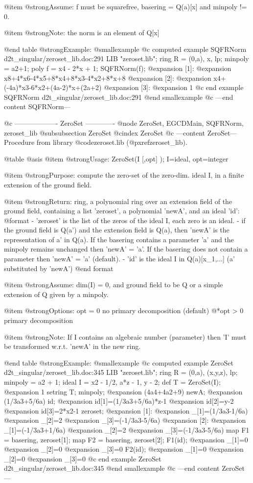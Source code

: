 @item @strong{Assume:}
f must be squarefree, basering = Q(a)[x] and minpoly != 0.

@item @strong{Note:}
the norm is an element of Q[x]

@end table
@strong{Example:}
@smallexample
@c computed example SQFRNorm d2t_singular/zeroset_lib.doc:291 
LIB "zeroset.lib";
ring R = (0,a), x, lp;
minpoly = a2+1;
poly f =  x4 - 2*x + 1;
SQFRNorm(f);
@expansion{} [1]:
@expansion{}    x8+4*x6-4*x5+8*x4+8*x3-4*x2+8*x+8
@expansion{} [2]:
@expansion{}    x4+(-4a)*x3-6*x2+(4a-2)*x+(2a+2)
@expansion{} [3]:
@expansion{}    1
@c end example SQFRNorm d2t_singular/zeroset_lib.doc:291
@end smallexample
@c ---end content SQFRNorm---

@c ------------------- ZeroSet -------------
@node ZeroSet, EGCDMain, SQFRNorm, zeroset_lib
@subsubsection ZeroSet
@cindex ZeroSet
@c ---content ZeroSet---
Procedure from library @code{zeroset.lib} (@pxref{zeroset_lib}).

@table @asis
@item @strong{Usage:}
ZeroSet(I [,opt] ); I=ideal, opt=integer

@item @strong{Purpose:}
compute the zero-set of the zero-dim. ideal I, in a finite extension
of the ground field.

@item @strong{Return:}
ring, a polynomial ring over an extension field of the ground field,
containing a list 'zeroset', a polynomial 'newA', and an
ideal 'id':
  @format
  - 'zeroset' is the list of the zeros of the ideal I, each zero is an ideal.
  - if the ground field is Q(a') and the extension field is Q(a), then
    'newA' is the representation of a' in Q(a).
    If the basering contains a parameter 'a' and the minpoly remains unchanged
    then 'newA' = 'a'.
    If the basering does not contain a parameter then 'newA' = 'a' (default).    
  - 'id' is the ideal I in Q(a)[x_1,...] (a' substituted by 'newA')
  @end format

@item @strong{Assume:}
dim(I) = 0, and ground field to be Q or a simple extension of Q given
by a minpoly.

@item @strong{Options:}
opt = 0 no primary decomposition (default)
@*opt > 0 primary decomposition

@item @strong{Note:}
If I contains an algebraic number (parameter) then 'I' must be
transformed w.r.t. 'newA' in the new ring.

@end table
@strong{Example:}
@smallexample
@c computed example ZeroSet d2t_singular/zeroset_lib.doc:345 
LIB "zeroset.lib";
ring R = (0,a), (x,y,z), lp;
minpoly = a2 + 1;
ideal I = x2 - 1/2, a*z - 1, y - 2;
def T = ZeroSet(I);
@expansion{} 1
setring T;
minpoly;
@expansion{} (4a4+4a2+9)
newA;
@expansion{} (1/3a3+5/6a)
id;
@expansion{} id[1]=(1/3a3+5/6a)*z-1
@expansion{} id[2]=y-2
@expansion{} id[3]=2*x2-1
zeroset;
@expansion{} [1]:
@expansion{}    _[1]=(1/3a3-1/6a)
@expansion{}    _[2]=2
@expansion{}    _[3]=(-1/3a3-5/6a)
@expansion{} [2]:
@expansion{}    _[1]=(-1/3a3+1/6a)
@expansion{}    _[2]=2
@expansion{}    _[3]=(-1/3a3-5/6a)
map F1 = basering, zeroset[1];
map F2 = basering, zeroset[2];
F1(id);
@expansion{} _[1]=0
@expansion{} _[2]=0
@expansion{} _[3]=0
F2(id);
@expansion{} _[1]=0
@expansion{} _[2]=0
@expansion{} _[3]=0
@c end example ZeroSet d2t_singular/zeroset_lib.doc:345
@end smallexample
@c ---end content ZeroSet---

